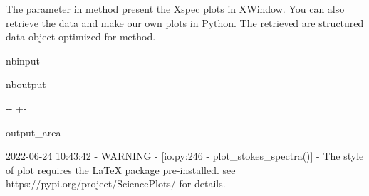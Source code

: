 \documentclass[letterpaper,10pt,english]{sphinxmanual}
\newlength\nbsphinxcodecellspacing
\begin{document}
\sphinxAtStartPar
The parameter  in method  present the Xspec plots in XWindow. You can also retrieve the data and make our own plots in Python. The retrieved  are structured data object optimized for  method.

\begin{sphinxuseclass}{nbinput}
{
\begin{sphinxVerbatim}[commandchars=\\\{\}]
\llap{\color{nbsphinxin}[5]:\,\hspace{\fboxrule}\hspace{\fboxsep}}
\end{sphinxVerbatim}
}

\end{sphinxuseclass}
\begin{sphinxuseclass}{nboutput}
{

\kern-\sphinxverbatimsmallskipamount\kern-\baselineskip
\kern+\FrameHeightAdjust\kern-\fboxrule
\vspace{\nbsphinxcodecellspacing}

\begin{sphinxuseclass}{output_area}
\begin{sphinxuseclass}{}


\begin{sphinxVerbatim}[commandchars=\\\{\}]
2022-06-24 10:43:42 - WARNING - [io.py:246 - plot\_stokes\_spectra()] - The style of plot requires the LaTeX package pre-installed. see https://pypi.org/project/SciencePlots/ for details.
\end{sphinxVerbatim}



\end{sphinxuseclass}
\end{sphinxuseclass}
}

\end{sphinxuseclass}
\end{document}
